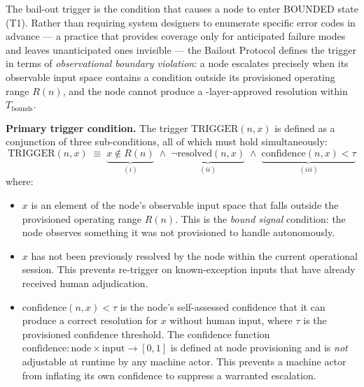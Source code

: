 The bail-out trigger is the condition that causes a node to enter BOUNDED state (T1). Rather than requiring system designers to enumerate specific error codes in advance --- a practice that provides coverage only for anticipated failure modes and leaves unanticipated ones invisible --- the Bailout Protocol defines the trigger in terms of \emph{observational boundary violation}: a node escalates precisely when its observable input space contains a condition outside its provisioned operating range $R(n)$, and the node cannot produce a \fact-layer-approved resolution within $T_{\text{bounds}}$.

\bigskip
\noindent\textbf{Primary trigger condition.} The trigger $\text{TRIGGER}(n, x)$ is defined as a conjunction of three sub-conditions, all of which must hold simultaneously:
\begin{equation}
\text{TRIGGER}(n, x) \;\equiv\; \underbrace{x \notin R(n)}_{(i)} \;\land\; \underbrace{\neg\text{resolved}(n, x)}_{(ii)} \;\land\; \underbrace{\text{confidence}(n, x) < \tau}_{(iii)} \tag{TC}
\end{equation}
where:

\begin{itemize}\itemsep=0pt
\item[(i)] $x$ is an element of the node's observable input space that falls outside the provisioned operating range $R(n)$. This is the \emph{bound signal} condition: the node observes something it was not provisioned to handle autonomously.
\item[(ii)] $x$ has not been previously resolved by the node within the current operational session. This prevents re-trigger on known-exception inputs that have already received human adjudication.
\item[(iii)] $\text{confidence}(n, x) < \tau$ is the node's self-assessed confidence that it can produce a correct resolution for $x$ without human input, where $\tau$ is the provisioned confidence threshold. The confidence function $\text{confidence} : \text{node} \times \text{input} \rightarrow [0, 1]$ is defined at node provisioning and is \emph{not} adjustable at runtime by any machine actor. This prevents a machine actor from inflating its own confidence to suppress a warranted escalation.
\end{itemize}

